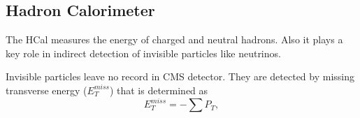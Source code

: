 
\subsection{Hadron Calorimeter}



The HCal measures the energy of charged and neutral hadrons. Also it plays a key role in indirect detection of invisible particles like neutrinos. 

Invisible particles leave no record in CMS detector. They are detected by missing transverse energy ($E_T^{miss}$) that is determined as 
\begin{equation}\label{eq:MET}
  E_T^{miss} = - \sum P_T,
\end{equation}

